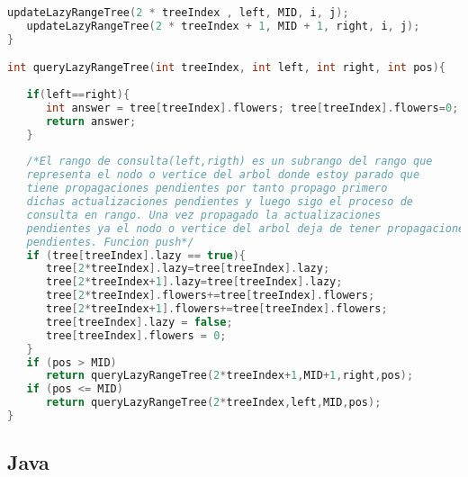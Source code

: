\begin{lstlisting}[language=C++]
   updateLazyRangeTree(2 * treeIndex , left, MID, i, j);
   updateLazyRangeTree(2 * treeIndex + 1, MID + 1, right, i, j);
}

int queryLazyRangeTree(int treeIndex, int left, int right, int pos){
	
   if(left==right){ 
      int answer = tree[treeIndex].flowers; tree[treeIndex].flowers=0;
      return answer;
   }
	
   /*El rango de consulta(left,rigth) es un subrango del rango que 
   representa el nodo o vertice del arbol donde estoy parado que 
   tiene propagaciones pendientes por tanto propago primero 
   dichas actualizaciones pendientes y luego sigo el proceso de
   consulta en rango. Una vez propagado la actualizaciones
   pendientes ya el nodo o vertice del arbol deja de tener propagaciones
   pendientes. Funcion push*/	
   if (tree[treeIndex].lazy == true){
      tree[2*treeIndex].lazy=tree[treeIndex].lazy;
      tree[2*treeIndex+1].lazy=tree[treeIndex].lazy;
      tree[2*treeIndex].flowers+=tree[treeIndex].flowers;
      tree[2*treeIndex+1].flowers+=tree[treeIndex].flowers;
      tree[treeIndex].lazy = false;
      tree[treeIndex].flowers = 0;
   }
   if (pos > MID)
      return queryLazyRangeTree(2*treeIndex+1,MID+1,right,pos);
   if (pos <= MID)
      return queryLazyRangeTree(2*treeIndex,left,MID,pos);
}

\end{lstlisting}


\subsection{Java}


